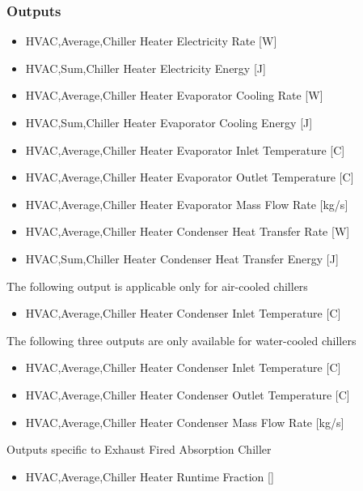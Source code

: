 \subsubsection{Outputs}\label{outputs-9-005}

\begin{itemize}
    \item
    HVAC,Average,Chiller Heater Electricity Rate {[}W{]}
    \item
    HVAC,Sum,Chiller Heater Electricity Energy {[}J{]}
    \item
    HVAC,Average,Chiller Heater Evaporator Cooling Rate {[}W{]}
    \item
    HVAC,Sum,Chiller Heater Evaporator Cooling Energy {[}J{]}
    \item
    HVAC,Average,Chiller Heater Evaporator Inlet Temperature {[}C{]}
    \item
    HVAC,Average,Chiller Heater Evaporator Outlet Temperature {[}C{]}
    \item
    HVAC,Average,Chiller Heater Evaporator Mass Flow Rate {[}kg/s{]}
    \item
    HVAC,Average,Chiller Heater Condenser Heat Transfer Rate {[}W{]}
    \item
    HVAC,Sum,Chiller Heater Condenser Heat Transfer Energy {[}J{]}
\end{itemize}

The following output is applicable only for air-cooled chillers

\begin{itemize}
    \tightlist
    \item
    HVAC,Average,Chiller Heater Condenser Inlet Temperature {[}C{]}
\end{itemize}

The following three outputs are only available for water-cooled chillers

\begin{itemize}
    \item
    HVAC,Average,Chiller Heater Condenser Inlet Temperature {[}C{]}
    \item
    HVAC,Average,Chiller Heater Condenser Outlet Temperature {[}C{]}
    \item
    HVAC,Average,Chiller Heater Condenser Mass Flow Rate {[}kg/s{]}
\end{itemize}

Outputs specific to Exhaust Fired Absorption Chiller

\begin{itemize}
    \tightlist
    \item
    HVAC,Average,Chiller Heater Runtime Fraction {[]}
\end{itemize}

